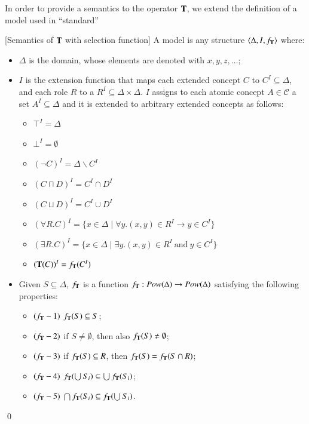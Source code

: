 \documentclass[a4paper, 11pt, oneside]{elsarticle}
\newcommand{\tip}{{\bf T}}
\newcommand{\vuoto} {\emptyset}
\newcommand{\nott} {\lnot}
\newcommand{\tc} {\mid}
\newcommand{\imp} {\rightarrow}
\newenvironment{definition}
{\begin{defi} \rm}{\qed \end{defi}}
\newcounter{posu}
\newtheorem{definition}[posu]{Definition}
\begin{document}
In order to provide a semantics to the operator $\tip$, we extend the definition of a model used in ``standard''

\begin{definition}[Semantics of $\tip$ with selection function]\label{Semantics
with f_tip} A model is any structure $\langle \Delta, I, f_\tip \rangle$
where:

\begin{itemize}
\item $\Delta$ is the domain, whose elements are denoted with $x, y, z, \dots$;
\item $I$ is the extension function that
maps each extended concept $C$
to $C^I \subseteq \Delta$, and each role $R$ to a $R^I \subseteq
\Delta \times \Delta$. $I$ assigns to each atomic concept $A \in
\mathcal{C}$ a set $A^I \subseteq \Delta$ and it is extended to
arbitrary extended concepts as follows:

\begin{itemize}
  \item $\top^I=\Delta$
  \item $\bot^I=\vuoto$
  \item $(\nott C)^I=\Delta \backslash C^I$
  \item $(C \sqcap D)^I=C^I \cap D^I$
  \item $(C \sqcup D)^I=C^I \cup D^I$
  \item $(\forall R.C)^I=\{x \in \Delta \tc \forall y. (x,y) \in R^I \imp y \in C^I\}$
  \item $(\exists R.C)^I=\{x \in \Delta \tc \exists y.(x,y) \in R^I \ \mbox{and} \ y \in C^I\}$
  \item $(\tip(C))^I = f_\tip(C^I)$
\end{itemize}


\item Given $S \subseteq \Delta$, $f_\tip$ is a function $f_\tip : Pow(\Delta) \rightarrow Pow(\Delta)$
satisfying the
following properties:

\begin{itemize}
\item $(f_\tip-1)$ $f_\tip(S) \subseteq S$;
\item $(f_\tip-2)$ if $S \neq \emptyset$, then also $f_\tip(S)
\neq \emptyset$;
\item $(f_\tip-3)$ if $f_\tip(S) \subseteq R$, then $f_\tip(S) = f_\tip(S \cap R)$;
 \item $(f_\tip-4)$ $f_\tip(\bigcup S_i ) \subseteq \bigcup f_\tip(S_i)$;
\item $(f_\tip-5)$ $\bigcap f_\tip(S_i) \subseteq  f_\tip(\bigcup S_i)$.
\end{itemize}

\end{itemize}

\end{definition}
\end{document}
